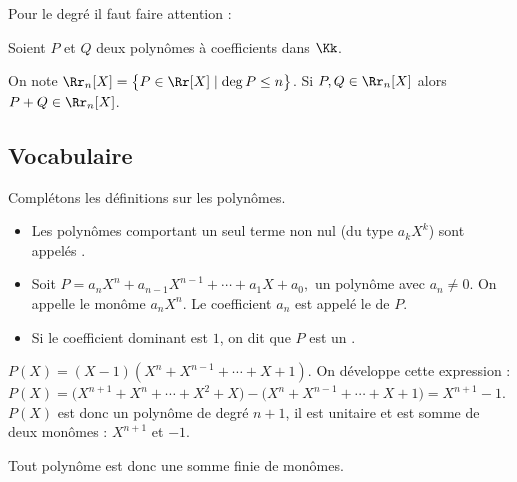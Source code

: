 \documentclass[class=report,crop=false]{standalone}
\begin{document}
Pour le degré il faut faire attention :
\begin{proposition}
Soient $P$ et $Q$ deux polynômes à coefficients dans $\Kk$.


\end{proposition}


On note $\Rr_n[X]= \big\{P \in \Rr[X] \mid \deg P \le n\big\}$.
Si $P,Q \in \Rr_n[X]$ alors $P+Q \in \Rr_n[X]$.


\subsection{Vocabulaire}

Complétons les définitions sur les polynômes.

\begin{definition}
\sauteligne
\begin{itemize}
\item Les polynômes comportant un seul terme non nul (du type $a_kX^k$) sont
appelés .

\item Soit $P=a_nX^n+a_{n-1}X^{n-1}+\cdots + a_1X+a_0,$ un polynôme avec
$a_n\neq0$. On appelle  le monôme $a_nX^n$. Le coefficient
$a_n$ est appelé le  de $P$.

\item Si le coefficient dominant est $1$, on dit que $P$ est un .
\end{itemize}
\end{definition}

\begin{exemple}
$P(X)=(X-1)(X^n+X^{n-1}+\cdots + X+1)$.
On développe cette expression :
$P(X)= \big(X^{n+1}+X^{n}+\cdots + X^2+X\big) - \big(X^n+X^{n-1}+\cdots + X+1\big) = X^{n+1} - 1$.
$P(X)$ est donc un polynôme de degré $n+1$, il est unitaire et
est somme de deux monômes : $X^{n+1}$ et $-1$.
\end{exemple}


\begin{remarque*}
Tout polynôme est donc une somme finie de monômes.
\end{remarque*}

\end{document}
